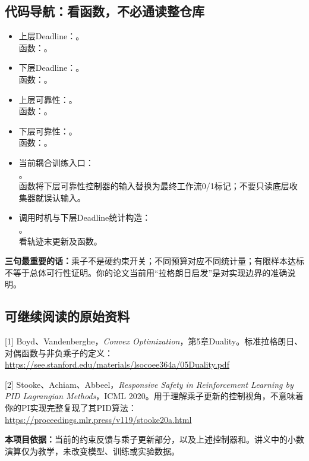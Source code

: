 \documentclass[UTF8,11pt,a4paper,fontset=fandol]{ctexart}
\begin{document}
\subsection*{代码导航：看函数，不必通读整仓库}
\begin{itemize}
\item 上层Deadline：。\\
函数：{\small{}}。
\item 下层Deadline：。\\
函数：{\small{}}。
\item 上层可靠性：。\\
函数：{\small{}}。
\item 下层可靠性：。\\
函数：{\small{}}。
\item 当前耦合训练入口：\\
{\footnotesize{}}。\\
函数{\small{}}将下层可靠性控制器的输入替换为最终工作流0/1标记；不要只读底层收集器就误认输入。
\item 调用时机与下层Deadline统计构造：\\
{\footnotesize{}}。\\
看轨迹末更新及函数{\footnotesize{}}。
\end{itemize}

\textbf{三句最重要的话：}乘子不是硬约束开关；不同预算对应不同统计量；有限样本达标不等于总体可行性证明。你的论文当前用“拉格朗日启发”是对实现边界的准确说明。

\subsection*{可继续阅读的原始资料}
\footnotesize
[1] Boyd、Vandenberghe，\emph{Convex Optimization}，第5章Duality。标准拉格朗日、对偶函数与非负乘子的定义：
\url{https://see.stanford.edu/materials/lsocoee364a/05Duality.pdf}

[2] Stooke、Achiam、Abbeel，\emph{Responsive Safety in Reinforcement Learning by PID Lagrangian Methods}，ICML 2020。用于理解乘子更新的控制视角，不意味着你的PI实现完整复现了其PID算法：
\url{https://proceedings.mlr.press/v119/stooke20a.html}

\textbf{本项目依据：}当前的约束反馈与乘子更新部分，以及上述控制器和。讲义中的小数演算仅为教学，未改变模型、训练或实验数据。
\endgroup
\end{document}
